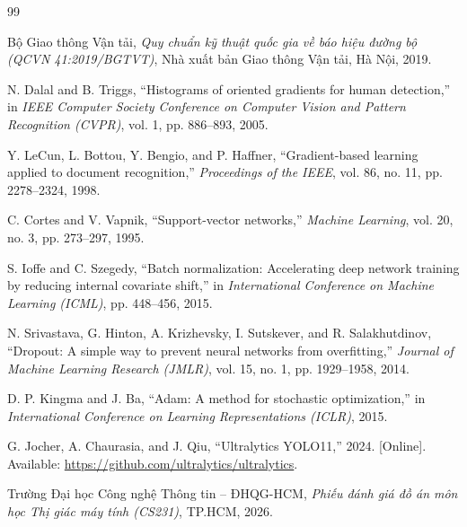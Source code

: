 \newpage
\renewcommand{\refname}{Tài liệu tham khảo}
\begin{thebibliography}{99}

 Bộ Giao thông Vận tải, \emph{Quy chuẩn kỹ thuật quốc gia về báo hiệu đường bộ (QCVN 41:2019/BGTVT)}, Nhà xuất bản Giao thông Vận tải, Hà Nội, 2019.

 N. Dalal and B. Triggs, ``Histograms of oriented gradients for human detection,'' in \emph{IEEE Computer Society Conference on Computer Vision and Pattern Recognition (CVPR)}, vol. 1, pp. 886--893, 2005.

 Y. LeCun, L. Bottou, Y. Bengio, and P. Haffner, ``Gradient-based learning applied to document recognition,'' \emph{Proceedings of the IEEE}, vol. 86, no. 11, pp. 2278--2324, 1998.

 C. Cortes and V. Vapnik, ``Support-vector networks,'' \emph{Machine Learning}, vol. 20, no. 3, pp. 273--297, 1995.

 S. Ioffe and C. Szegedy, ``Batch normalization: Accelerating deep network training by reducing internal covariate shift,'' in \emph{International Conference on Machine Learning (ICML)}, pp. 448--456, 2015.

 N. Srivastava, G. Hinton, A. Krizhevsky, I. Sutskever, and R. Salakhutdinov, ``Dropout: A simple way to prevent neural networks from overfitting,'' \emph{Journal of Machine Learning Research (JMLR)}, vol. 15, no. 1, pp. 1929--1958, 2014.

 D. P. Kingma and J. Ba, ``Adam: A method for stochastic optimization,'' in \emph{International Conference on Learning Representations (ICLR)}, 2015.

 G. Jocher, A. Chaurasia, and J. Qiu, ``Ultralytics YOLO11,'' 2024. [Online]. Available: \url{https://github.com/ultralytics/ultralytics}.

 Trường Đại học Công nghệ Thông tin -- ĐHQG-HCM, \emph{Phiếu đánh giá đồ án môn học Thị giác máy tính (CS231)}, TP.HCM, 2026.

\end{thebibliography}
